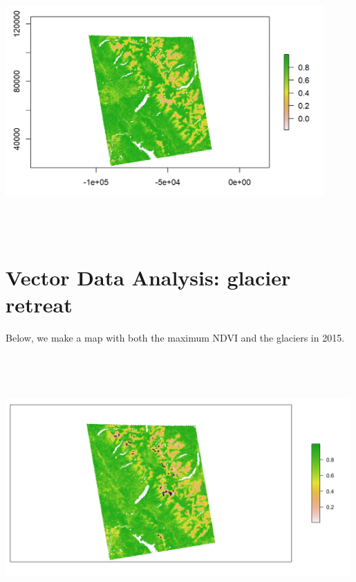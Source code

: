 \documentclass[11pt]{article}
\begin{document}
\begin{center}
\includegraphics[width=4.8in, height=4in]{ndvi_raster.png}
\end{center}

\section*{Vector Data Analysis: glacier retreat}

Below, we make a map with both the maximum NDVI and the glaciers in 2015.

\begin{center}
\includegraphics[width=5.2in, height=4in]{q4_new.png}
\end{center}
\end{document}
